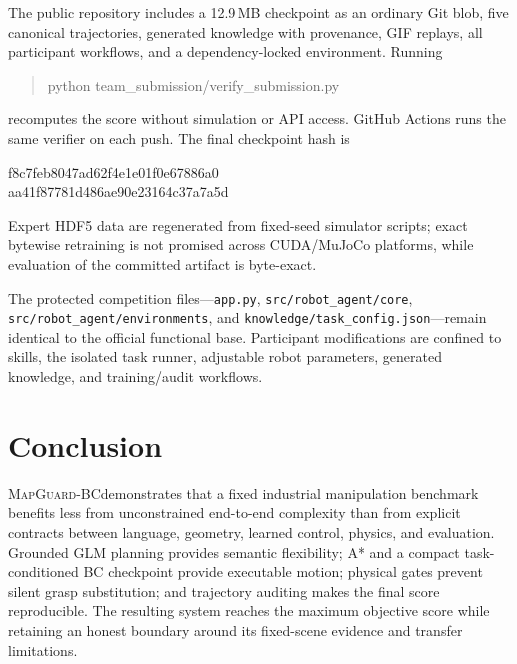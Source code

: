 \documentclass[10pt,twocolumn]{article}
\newcommand{\method}{\textsc{MapGuard-BC}}
\newcommand{\code}[1]{\texttt{#1}}
\begin{document}
The public repository includes a 12.9\,MB checkpoint as an ordinary Git blob, five canonical trajectories, generated knowledge with provenance, GIF replays, all participant workflows, and a dependency-locked environment. Running
\begin{quote}\small\ttfamily
python team\_submission/verify\_submission.py
\end{quote}
recomputes the score without simulation or API access. GitHub Actions runs the same verifier on each push. The final checkpoint hash is
\begin{center}\scriptsize\ttfamily
f8c7feb8047ad62f4e1e01f0e67886a0\\
aa41f87781d486ae90e23164c37a7a5d
\end{center}
Expert HDF5 data are regenerated from fixed-seed simulator scripts; exact bytewise retraining is not promised across CUDA/MuJoCo platforms, while evaluation of the committed artifact is byte-exact.

{\raggedright The protected competition files---\code{app.py}, \code{src/robot\_agent/core}, \code{src/robot\_agent/environments}, and \code{knowledge/task\_config.json}---remain identical to the official functional base. Participant modifications are confined to skills, the isolated task runner, adjustable robot parameters, generated knowledge, and training/audit workflows.\par}

\section{Conclusion}

\method demonstrates that a fixed industrial manipulation benchmark benefits less from unconstrained end-to-end complexity than from explicit contracts between language, geometry, learned control, physics, and evaluation. Grounded GLM planning provides semantic flexibility; A* and a compact task-conditioned BC checkpoint provide executable motion; physical gates prevent silent grasp substitution; and trajectory auditing makes the final score reproducible. The resulting system reaches the maximum objective score while retaining an honest boundary around its fixed-scene evidence and transfer limitations.

\renewcommand{\bibfont}{\scriptsize}
\setlength{\bibsep}{1pt plus 0.3ex}


\end{document}
